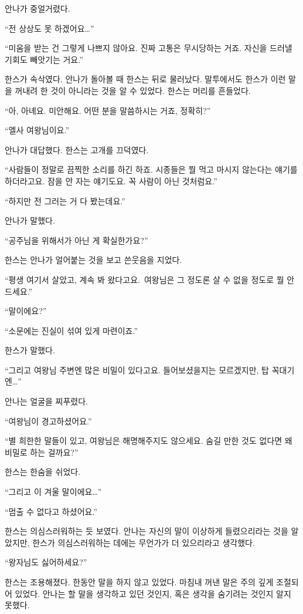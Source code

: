 안나가 중얼거렸다.

``전 상상도 못 하겠어요\ldots''

``미움을 받는 건 그렇게 나쁘지 않아요. 진짜 고통은 무시당하는 거죠. 자신을 드러낼 기회도 빼앗기는 거요.''

한스가 속삭였다. 안나가 돌아볼 때 한스는 뒤로 물러났다. 말투에서도 한스가 이런 말을 꺼내려 한 것이 아니라는 것을 알 수 있었다. 한스는 머리를 흔들었다.

``아, 아녜요. 미안해요. 어떤 분을 말씀하시는 거죠, 정확히?''

``엘사 여왕님이요.''

안나가 대답했다. 한스는 고개를 끄덕였다.

``사람들이 정말로 끔찍한 소리를 하긴 하죠. 시종들은 뭘 먹고 마시지 않는다는 얘기를 하더라고요. 잠을 안 자는 얘기도요. 꼭 사람이 아닌 것처럼요.''

``하지만 전 그러는 거 다 봤는데요.''

안나가 말했다.

``공주님을 위해서가 아닌 게 확실한가요?''

한스는 안나가 얼어붙는 것을 보고 쓴웃음을 지었다.

``평생 여기서 살았고, 계속 봐 왔다고요. 여왕님은 그 정도론 살 수 없을 정도로 뭘 안 드세요.''

`` 말이에요?''

``소문에는 진실이 섞여 있게 마련이죠.''

한스가 말했다.

``그리고 여왕님 주변엔 많은 비밀이 있다고요. 들어보셨을지는 모르겠지만, 탑 꼭대기엔\ldots''

안나는 얼굴을 찌푸렸다.

``여왕님이 경고하셨어요.''

``별 희한한 말들이 있고, 여왕님은 해명해주지도 않으세요. 숨길 만한 것도 없다면 왜 비밀로 하는 걸까요?''

한스는 한숨을 쉬었다.

``그리고 이 겨울 말이에요\ldots''

``멈출 수 없다고 하셨어요.''

한스는 의심스러워하는 듯 보였다. 안나는 자신의 말이 이상하게 들렸으리라는 것을 알았지만, 한스가 의심스러워하는 데에는 무언가가 더 있으리라고 생각했다.

``왕자님도 싫어하세요?''

한스는 조용해졌다. 한동안 말을 하지 않고 있었다. 마침내 꺼낸 말은 주의 깊게 조절되어 있었다. 안나는 할 말을 생각하고 있던 것인지, 혹은 생각을 숨기려는 것인지 알지 못했다.

